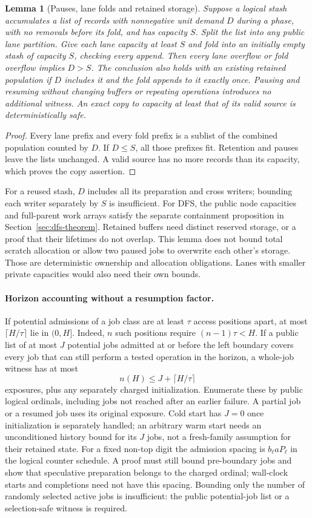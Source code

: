 \documentclass[11pt]{article}
\newtheorem{lemma}[theorem]{Lemma}
\theoremstyle{definition}
\theoremstyle{remark}
\begin{document}
\begin{lemma}[Pauses, lane folds and retained storage]
\label{lem:pause-storage}
Suppose a logical stash accumulates a list of records with nonnegative
unit demand $D$ during a phase, with no removals before its fold, and has
capacity $S$. Split the list into any public lane partition. Give each
lane capacity at least $S$ and fold into an initially empty stash of
capacity $S$, checking every append. Then every lane overflow or fold
overflow implies $D>S$. The conclusion also holds with an existing
retained population if $D$ includes it and the fold appends to it exactly
once. Pausing and resuming without changing buffers or repeating operations
introduces no additional witness. An exact copy to capacity at least that
of its valid source is deterministically safe.
\end{lemma}
\begin{proof}
Every lane prefix and every fold prefix is a sublist of the combined
population counted by $D$. If $D\le S$, all those prefixes fit. Retention
and pauses leave the lists unchanged. A valid source has no more records
than its capacity, which proves the copy assertion.
\end{proof}
For a reused stash, $D$ includes all its preparation and cross writers;
bounding each writer separately by $S$ is insufficient. For DFS, the
public node capacities and full-parent work arrays satisfy the separate
containment proposition in Section~\ref{sec:dfs-theorem}. Retained buffers
need distinct reserved storage, or a proof that their lifetimes do not
overlap. This lemma does not bound total scratch allocation or allow two
paused jobs to overwrite each other's storage. Those are deterministic
ownership and allocation obligations. Lanes with smaller private capacities
would also need their own bounds.

\paragraph{Horizon accounting without a resumption factor.}
If potential admissions of a job class are at least $\tau$ access positions
apart, at most $\lceil H/\tau\rceil$ lie in $(0,H]$.
Indeed, $n$ such positions require $(n-1)\tau<H$.
If a public list of at most $J$ potential jobs admitted at or before the
left boundary covers every job that can still perform a tested operation
in the horizon, a whole-job witness has
at most
\[
 n(H)\le J+\lceil H/\tau\rceil
\]
exposures, plus any separately charged initialization. Enumerate these by
public logical ordinals, including jobs not reached after an earlier
failure. A partial job or a resumed job uses its original exposure. Cold
start has $J=0$ once initialization is separately handled; an arbitrary
warm start needs an unconditioned history bound for its $J$ jobs, not a
fresh-family assumption for their retained state.
For a fixed non-top digit the admission spacing is $b_\ell aP_\ell$ in
the logical counter schedule. A proof must still bound pre-boundary jobs
and show that speculative preparation belongs to the charged ordinal;
wall-clock starts and completions need not have this spacing. Bounding only
the number of randomly selected active jobs is insufficient: the public
potential-job list or a selection-safe witness is required.
\end{document}
